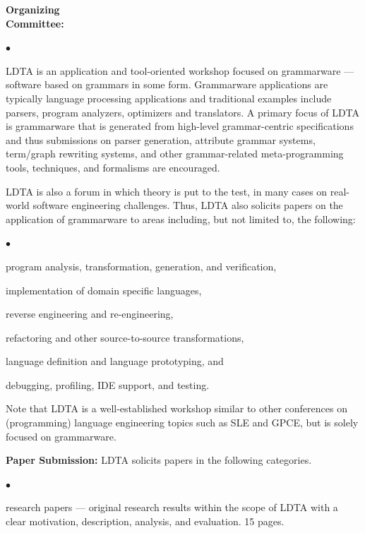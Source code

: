 \documentclass[10pt,A4paper]{article} \usepackage{graphicx,url}
\newenvironment{itemlist}{
                         \begin{list}{{$\bullet$}} 
                         {\setlength{\itemsep}{0pt} 
                         \setlength{\topsep}{0pt} 
                         \setlength{\partopsep}{2pt}
                         \setlength{\leftmargin}{6pt} 
                         \setlength{\labelwidth}{8pt} 
                         \setlength{\labelsep}{2pt} 
                         \setlength{\listparindent}{0pt}
                         \setlength{\parsep}{0cm}
                         \usecounter{enumi} 
                         \setlength{\parskip}{0.2cm}}}{\end{list} }
\newenvironment{inditemlist}{
                         \begin{list}{{$\bullet$}} 
                         {\setlength{\itemsep}{0pt} 
                         \setlength{\topsep}{0pt} 
                         \setlength{\partopsep}{2pt}
                         \setlength{\leftmargin}{12pt} 
                         \setlength{\labelwidth}{8pt} 
                         \setlength{\labelsep}{2pt} 
                         \setlength{\listparindent}{0pt}
                         \setlength{\parsep}{0.07cm}
                         \usecounter{enumi} 
                         \setlength{\parskip}{0.2cm}}}{\end{list}\vspace{2mm} }
\begin{document}
\begin{minipage}[t]{1.9in}
\medskip
\noindent
\textbf{Organizing\\ Committee:}
\begin{itemlist}
\item {}
\item {}
\end{itemlist}
\end{minipage}
\begin{minipage}[t]{5.1in}
LDTA is an application and tool-oriented workshop focused on
grammarware --- software based on grammars in some form.  Grammarware
applications are typically language processing applications and
traditional examples include parsers, program analyzers, optimizers
and translators.  A primary focus of LDTA is grammarware that is
generated from high-level grammar-centric specifications and thus
submissions on parser generation, attribute grammar systems,
term/graph rewriting systems, and other grammar-related
meta-programming tools, techniques, and formalisms are encouraged.

LDTA is also a forum in which theory is put to the test, in many cases
on real-world software engineering challenges.  Thus, LDTA also
solicits papers on the application of grammarware to areas including,
but not limited to, the following:
\begin{inditemlist}
\item program analysis, transformation, generation, and verification,
\item implementation of domain specific languages,
\item reverse engineering and re-engineering,
\item refactoring and other source-to-source transformations,
\item language definition and language prototyping, and
\item debugging, profiling, IDE support, and testing.
\end{inditemlist}

Note that LDTA is a well-established workshop similar to other
conferences on (programming) language engineering topics such as SLE
and GPCE, but is solely focused on grammarware.

\medskip
\textbf{Paper Submission:}
LDTA solicits papers in the following categories.
\begin{inditemlist}
\item research papers --- original research results within the scope of LDTA
  with a clear motivation, description, analysis, and evaluation. 15 pages.


\end{inditemlist}
\end{minipage}
\end{document}
